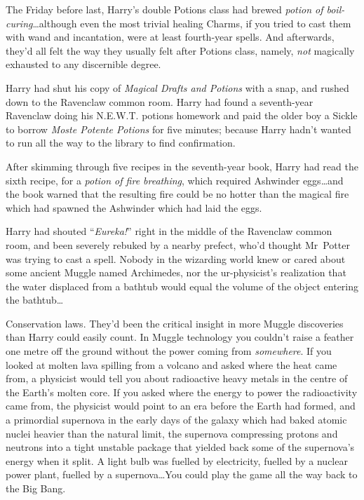 The Friday before last, Harry’s double Potions class had brewed \emph{potion of boil-curing}…although even the most trivial healing Charms, if you tried to cast them with wand and incantation, were at least fourth-year spells. And afterwards, they’d all felt the way they usually felt after Potions class, namely, \emph{not} magically exhausted to any discernible degree.

Harry had shut his copy of \emph{Magical Drafts and Potions} with a snap, and rushed down to the Ravenclaw common room. Harry had found a seventh-year Ravenclaw doing his N.E.W.T. potions homework and paid the older boy a Sickle to borrow \emph{Moste Potente Potions} for five minutes; because Harry hadn’t wanted to run all the way to the library to find confirmation.

After skimming through five recipes in the seventh-year book, Harry had read the sixth recipe, for a \emph{potion of fire breathing}, which required Ashwinder eggs…and the book warned that the resulting fire could be no hotter than the magical fire which had spawned the Ashwinder which had laid the eggs.

Harry had shouted “\emph{Eureka!}” right in the middle of the Ravenclaw common room, and been severely rebuked by a nearby prefect, who’d thought Mr~Potter was trying to cast a spell. Nobody in the wizarding world knew or cared about some ancient Muggle named Archimedes, nor the ur-physicist’s realization that the water displaced from a bathtub would equal the volume of the object entering the bathtub…

Conservation laws. They’d been the critical insight in more Muggle discoveries than Harry could easily count. In Muggle technology you couldn’t raise a feather one metre off the ground without the power coming from \emph{somewhere}. If you looked at molten lava spilling from a volcano and asked where the heat came from, a physicist would tell you about radioactive heavy metals in the centre of the Earth’s molten core. If you asked where the energy to power the radioactivity came from, the physicist would point to an era before the Earth had formed, and a primordial supernova in the early days of the galaxy which had baked atomic nuclei heavier than the natural limit, the supernova compressing protons and neutrons into a tight unstable package that yielded back some of the supernova’s energy when it split. A light bulb was fuelled by electricity, fuelled by a nuclear power plant, fuelled by a supernova…You could play the game all the way back to the Big Bang.

